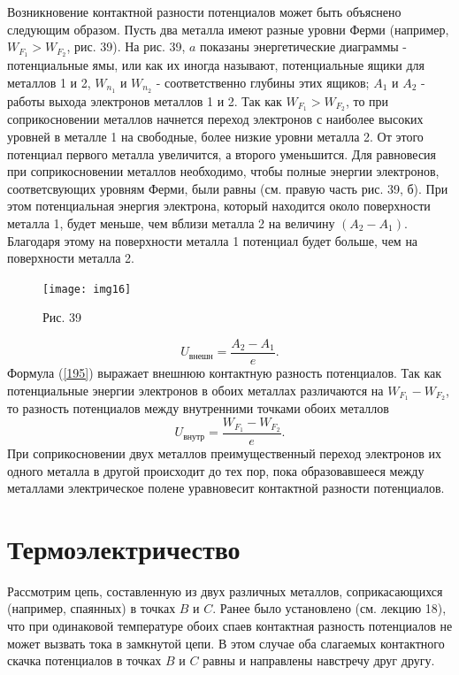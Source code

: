 \documentclass[a4paper,10pt]{book}
\begin{document}
Возникновение контактной разности потенциалов может быть объяснено следующим образом. Пусть два металла имеют разные уровни Ферми (например, $W_{F_1} > W_{F_2}$, рис. 39). На рис. 39, $a$ показаны энергетические диаграммы - потенциальные ямы, или как их иногда называют, потенциальные ящики для металлов 1 и 2, 
$W_{n_1}$ и $W_{n_2}$ - соответственно глубины этих ящиков; $A_1$ и $A_2$ - работы выхода электронов металлов 1 и 2. Так как $W_{F_1} > W_{F_2}$, то при соприкосновении металлов начнется переход электронов с наиболее высоких уровней в металле 1 на свободные, более низкие уровни металла 2. От этого потенциал первого металла увеличится, а второго уменьшится. Для равновесия при соприкосновении металлов необходимо, чтобы полные энергии электронов, соответсвующих уровням Ферми, были равны (см.  правую часть рис. 39, б). При этом потенциальная энергия электрона, который находится около поверхности металла 1, будет меньше, чем вблизи металла 2 на величину $(A_2 - A_1)$. Благодаря этому на поверхности металла 1 потенциал будет больше, чем на поверхности металла 2.

\begin{figure}[h]
\texttt{[image: img16]}
\caption{Рис. 39}
\label{img16}
\end{figure}
\begin{equation}\label{195}
 U_\textit{внешн} = \frac{A_2 - A_1}{e}.
\end{equation}
Формула (\ref{195}) выражает внешнюю контактную разность потенциалов. Так как потенциальные энергии электронов в обоих металлах различаются на $W_{F_1} - W_{F_2}$, то разность потенциалов между внутренними точками обоих металлов 
\begin{equation}\label{196}
 U_\textit{внутр} = \frac{W_{F_1} - W_{F_2}}{e}.
\end{equation}
При соприкосновении двух металлов преимущественный переход электронов их одного металла в другой происходит до тех пор, пока образовавшееся между металлами электрическое полене уравновесит контактной разности потенциалов.
\section{Термоэлектричество}
Рассмотрим цепь, составленную из двух различных металлов, соприкасающихся (например, спаянных) в точках $B$ и $C$. Ранее было установлено (см. лекцию 18), что при одинаковой температуре обоих спаев контактная разность потенциалов не может вызвать тока в замкнутой цепи. В этом случае оба слагаемых контактного скачка потенциалов в точках $B$ и $C$ равны и направлены навстречу друг другу.
\end{document}
